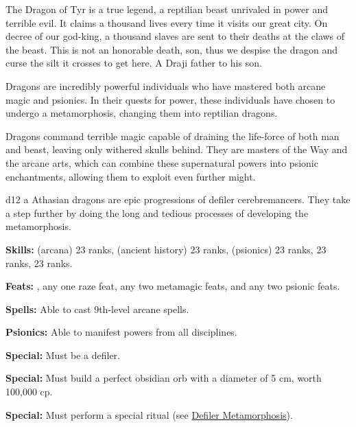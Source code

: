 {The Dragon of Tyr is a true legend, a reptilian beast unrivaled in power and terrible evil. It claims a thousand lives every time it visits our great city. On decree of our god-king, a thousand slaves are sent to their deaths at the claws of the beast. This is not an honorable death, son, thus we despise the dragon and curse the silt it crosses to get here.}
{A Draji father to his son.}
{
Dragons are incredibly powerful individuals who have mastered both arcane magic and psionics. In their quests for power, these individuals have chosen to undergo a metamorphosis, changing them into reptilian dragons.

Dragons command terrible magic capable of draining the life-force of both man and beast, leaving only withered skulls behind. They are masters of the Way and the arcane arts, which can combine these supernatural powers into psionic enchantments, allowing them to exploit even further might.
}
{d12}
{a}
{
Athasian dragons are epic progressions of defiler cerebremancers. They take a step further by doing the long and tedious processes of developing the metamorphosis.
}
{
\textbf{Skills:}  (arcana) 23 ranks,  (ancient history) 23 ranks,  (psionics) 23 ranks,  23 ranks,  23 ranks.

\textbf{Feats:} , any one raze feat, any two metamagic feats, and any two psionic feats.

\textbf{Spells:} Able to cast 9th-level arcane spells.

\textbf{Psionics:} Able to manifest powers from all disciplines.

\textbf{Special:} Must be a defiler.

\textbf{Special:} Must build a perfect obsidian orb with a diameter of 5 cm, worth 100,000 cp.

\textbf{Special:} Must perform a special ritual (see \hyperref[Defiler Metamorphosis]{Defiler Metamorphosis}).
}
